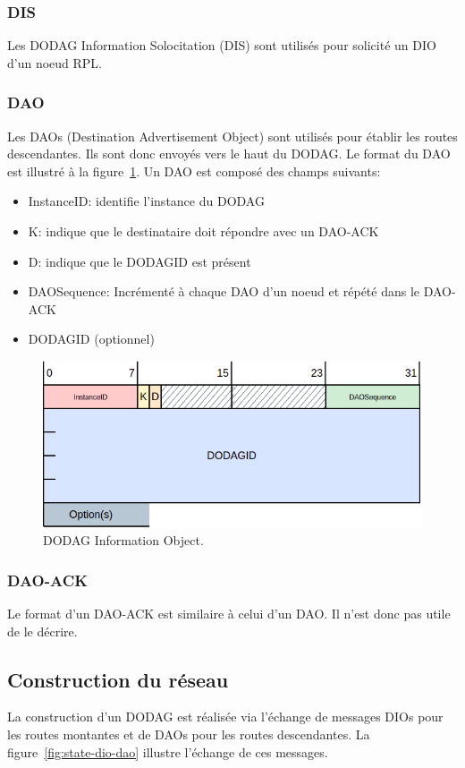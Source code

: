 \subsubsection*{DIS}
    Les DODAG Information Solocitation (DIS) sont utilisés pour solicité un DIO d'un noeud RPL.

\subsubsection*{DAO}%
    Les DAOs (Destination Advertisement Object) sont utilisés pour établir les routes descendantes.
    Ils sont donc envoyés vers le haut du DODAG. Le format du DAO est illustré à la figure~\ref{fig:state-dao}. Un DAO est composé des champs suivants:
    \begin{itemize}
        \item InstanceID: identifie l'instance du DODAG
        \item K: indique que le destinataire doit répondre avec un DAO-ACK
        \item D: indique que le DODAGID est présent
        \item DAOSequence: Incrémenté à chaque DAO d'un noeud et répété dans le DAO-ACK
        \item DODAGID (optionnel)
    \end{itemize}
    \begin{figure}[H]
        \centering
        \includegraphics[scale=0.5]{res/pictures/dao.drawio.png}
        \caption{DODAG Information Object.}
        \label{fig:state-dao}
    \end{figure}

\subsubsection*{DAO-ACK}
    Le format d'un DAO-ACK est similaire à celui d'un DAO. Il n'est donc pas utile de le décrire.

\subsection*{Construction du réseau}
    La construction d'un DODAG est réalisée via l'échange de messages DIOs pour les routes montantes et de DAOs pour les routes descendantes. La figure~\ref{fig:state-dio-dao} illustre l'échange de ces messages.

